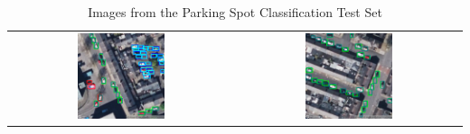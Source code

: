 \begin{table}[htbp]
\begin{tabular}{cc}
    \includegraphics[width=0.4\textwidth]{images/image5_classification_test_set.png} & \includegraphics[width=0.4\textwidth]{images/image6_classification_test_set.png} \\
  \end{tabular}
  \caption{Images from the Parking Spot Classification Test Set}
  \label{tab:test_images3}
\end{table}

\newpage{}